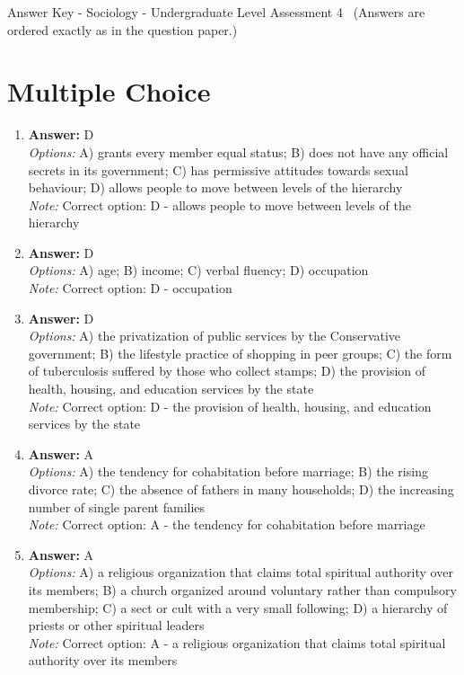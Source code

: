 \documentclass[12pt]{article}
\begin{document}
\begin{center}
Answer Key - Sociology - Undergraduate Level Assessment 4 \
\small (Answers are ordered exactly as in the question paper.)
\end{center}

\section*{Multiple Choice}
\begin{enumerate}[label=\arabic*.]
\item \textbf{Answer:} D
\\ \textit{Options:} A) grants every member equal status; B) does not have any official secrets in its government; C) has permissive attitudes towards sexual behaviour; D) allows people to move between levels of the hierarchy
\\ \textit{Note:} Correct option: D - allows people to move between levels of the hierarchy
\item \textbf{Answer:} D
\\ \textit{Options:} A) age; B) income; C) verbal fluency; D) occupation
\\ \textit{Note:} Correct option: D - occupation
\item \textbf{Answer:} D
\\ \textit{Options:} A) the privatization of public services by the Conservative government; B) the lifestyle practice of shopping in peer groups; C) the form of tuberculosis suffered by those who collect stamps; D) the provision of health, housing, and education services by the state
\\ \textit{Note:} Correct option: D - the provision of health, housing, and education services by the state
\item \textbf{Answer:} A
\\ \textit{Options:} A) the tendency for cohabitation before marriage; B) the rising divorce rate; C) the absence of fathers in many households; D) the increasing number of single parent families
\\ \textit{Note:} Correct option: A - the tendency for cohabitation before marriage
\item \textbf{Answer:} A
\\ \textit{Options:} A) a religious organization that claims total spiritual authority over its members; B) a church organized around voluntary rather than compulsory membership; C) a sect or cult with a very small following; D) a hierarchy of priests or other spiritual leaders
\\ \textit{Note:} Correct option: A - a religious organization that claims total spiritual authority over its members
\end{enumerate}
\end{document}

